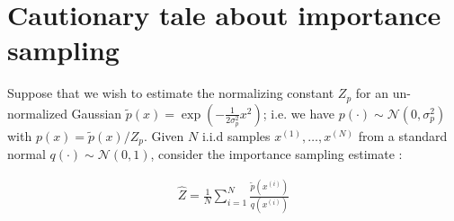 \documentclass[11pt]{article}
\begin{document}

\section{Cautionary tale about importance sampling}\label{sec:num1}

Suppose that we wish to estimate the normalizing constant $Z_p$ for an un-normalized Gaussian ${\tilde{p}(x) = \exp \left( - \frac{1}{2\sigma_p ^2} x^2 \right)}$; i.e. we have $p(\cdot) \sim \mathcal{N}(0, \sigma_p ^2)$ with $p(x) = \tilde{p}(x)/Z_p$. Given $N$ i.i.d samples $x^{(1)}, \dots , x^{(N)}$ from a standard normal $q(\cdot) \sim \mathcal{N}(0,1)$, consider the importance sampling estimate :

\begin{align*}
\hat{Z} = \frac{1}{N} \sum_{i=1} ^{N} \frac{\tilde{p}(x^{(i)})}{q(x^{(i)})}
\end{align*}
\end{document}
